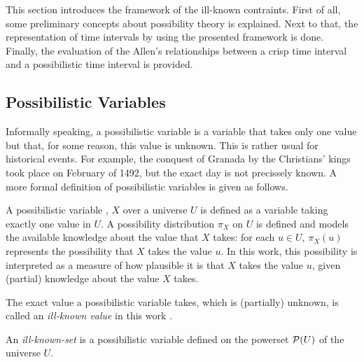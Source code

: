 This section introduces the framework of the ill-known contraints. First of all, some preliminary concepts about possibility theory is explained. Next to that, the representation of time intervals by using the presented framework is done. Finally, the evaluation of the Allen's relationships between a crisp time interval and a possibilistic time interval is provided.
 
\subsection{\label{subsec:possibilistic-variables}Possibilistic Variables}
Informally speaking, a possibilistic variable is a variable that takes only one value but that, for some reason, this value is unknown. This is rather usual for historical events. For example, the conquest of Granada by the Christians' kings took place on February of 1492, but the exact day is not precissely known.
A more formal definition of possibilistic variables is given as follows.

\begin{definition}
\label{def:ill-known-value}
A possibilistic variable \cite{Dubois1988a}, \cite{Pons2011} $X$ over a universe $U$ is defined as a variable taking exactly one value in $U$. A possibility distribution $\pi_X$ on $U$ is defined and models the available knowledge about the value that $X$ takes: for each $u\in U$, $\pi_X(u)$ represents the possibility that $X$ takes the value $u$. In this work, this possibility is interpreted as a measure of how plausible it is that $X$ takes the value $u$, given (partial) knowledge about the value $X$ takes.
\end{definition}

The exact value a possibilistic variable takes, which is (partially) unknown, is called an \emph{ill-known value} in this work \cite{Dubois1988a}.

An \emph{ill-known-set} \cite{Dubois1988a} is a possibilistic variable defined on the powerset $\mathcal{P}(U)$ of the universe $U$. 



